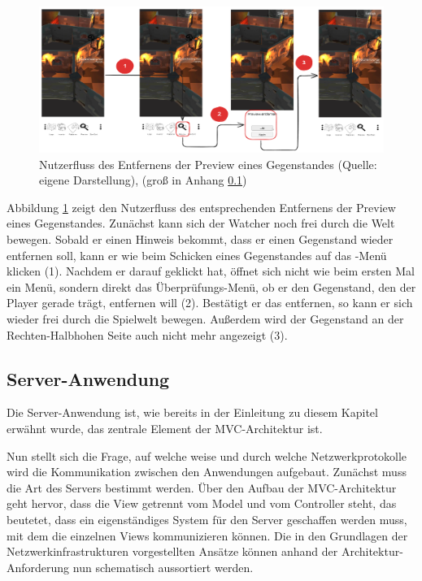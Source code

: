 \begin{figure}[ht]
\centering
\includegraphics[width=1\linewidth]{content/pictures/RemovePreviewFlow.png}
\caption{Nutzerfluss des Entfernens der Preview eines Gegenstandes (Quelle: eigene Darstellung), (groß in Anhang \ref{})}
\label{fig:userflow-remove-preview-cm}
\end{figure}

Abbildung \ref{fig:userflow-remove-preview-cm} zeigt den Nutzerfluss des entsprechenden Entfernens der Preview eines Gegenstandes. Zunächst kann sich der Watcher noch frei durch die Welt bewegen. Sobald er einen Hinweis bekommt, dass er einen Gegenstand wieder entfernen soll, kann er wie beim Schicken eines Gegenstandes auf das -Menü klicken (1). Nachdem er darauf geklickt hat, öffnet sich nicht wie beim ersten Mal ein Menü, sondern direkt das Überprüfungs-Menü, ob er den Gegenstand, den der Player gerade trägt, entfernen will (2). Bestätigt er das entfernen, so kann er sich wieder frei durch die Spielwelt bewegen. Außerdem wird der Gegenstand an der Rechten-Halbhohen Seite auch nicht mehr angezeigt (3). 


\subsection{Server-Anwendung}
Die Server-Anwendung ist, wie bereits in der Einleitung zu diesem Kapitel erwähnt wurde, das zentrale Element der \ac{MVC}-Architektur ist. 

Nun stellt sich die Frage, auf welche weise und durch welche Netzwerkprotokolle wird die Kommunikation zwischen den Anwendungen aufgebaut. Zunächst muss die Art des Servers bestimmt werden. Über den Aufbau der \ac{MVC}-Architektur geht hervor, dass die View getrennt vom Model und vom Controller steht, das beutetet, dass ein eigenständiges System für den Server geschaffen werden muss, mit dem die einzelnen Views kommunizieren können. Die in den Grundlagen der Netzwerkinfrastrukturen vorgestellten Ansätze können anhand der Architektur-Anforderung nun schematisch aussortiert werden. 

